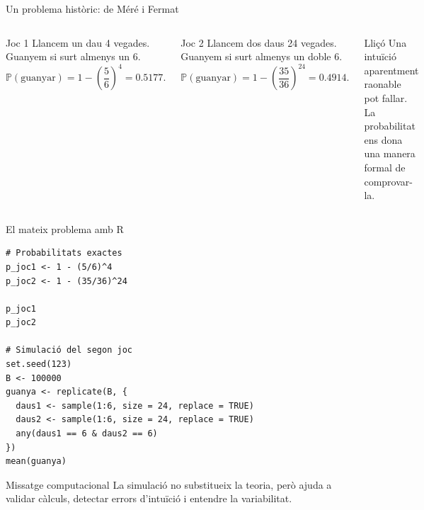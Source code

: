 \documentclass[10pt,aspectratio=169]{beamer}
\newcommand{\Prob}{\mathbb{P}}
\begin{document}
\begin{frame}{Un problema històric: de Méré i Fermat}
\begin{columns}[T]
\begin{block}{Joc 1}
Llancem un dau 4 vegades. Guanyem si surt almenys un 6.
\[
\Prob(\text{guanyar})=1-\left(\frac{5}{6}\right)^4=0.5177.
\]
\end{block}
\begin{block}{Joc 2}
Llancem dos daus 24 vegades. Guanyem si surt almenys un doble 6.
\[
\Prob(\text{guanyar})=1-\left(\frac{35}{36}\right)^{24}=0.4914.
\]
\end{block}
\begin{alertblock}{Lliçó}
Una intuïció aparentment raonable pot fallar. La probabilitat ens dona una manera formal de comprovar-la.
\end{alertblock}
\vspace{0.2cm}
\end{columns}
\end{frame}

\begin{frame}[fragile]{El mateix problema amb R}
\begin{lstlisting}
# Probabilitats exactes
p_joc1 <- 1 - (5/6)^4
p_joc2 <- 1 - (35/36)^24

p_joc1
p_joc2

# Simulació del segon joc
set.seed(123)
B <- 100000
guanya <- replicate(B, {
  daus1 <- sample(1:6, size = 24, replace = TRUE)
  daus2 <- sample(1:6, size = 24, replace = TRUE)
  any(daus1 == 6 & daus2 == 6)
})
mean(guanya)
\end{lstlisting}
\vspace{0.2cm}
\begin{block}{Missatge computacional}
La simulació no substitueix la teoria, però ajuda a validar càlculs, detectar errors d'intuïció i entendre la variabilitat.
\end{block}
\end{frame}
\end{document}
